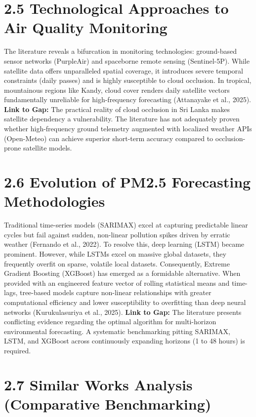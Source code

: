 \section{2.5 Technological Approaches to Air Quality
Monitoring}\label{technological-approaches-to-air-quality-monitoring}

The literature reveals a bifurcation in monitoring technologies:
ground-based sensor networks (PurpleAir) and spaceborne remote sensing
(Sentinel-5P). While satellite data offers unparalleled spatial
coverage, it introduces severe temporal constraints (daily passes) and
is highly susceptible to cloud occlusion. In tropical, mountainous
regions like Kandy, cloud cover renders daily satellite vectors
fundamentally unreliable for high-frequency forecasting (Attanayake et
al., 2025). \textbf{Link to Gap:} The practical reality of cloud
occlusion in Sri Lanka makes satellite dependency a vulnerability. The
literature has not adequately proven whether high-frequency ground
telemetry augmented with localized weather APIs (Open-Meteo) can achieve
superior short-term accuracy compared to occlusion-prone satellite
models.

\section{2.6 Evolution of PM2.5 Forecasting
Methodologies}\label{evolution-of-pm2.5-forecasting-methodologies}

Traditional time-series models (SARIMAX) excel at capturing predictable
linear cycles but fail against sudden, non-linear pollution spikes
driven by erratic weather (Fernando et al., 2022). To resolve this, deep
learning (LSTM) became prominent. However, while LSTMs excel on massive
global datasets, they frequently overfit on sparse, volatile local
datasets. Consequently, Extreme Gradient Boosting (XGBoost) has emerged
as a formidable alternative. When provided with an engineered feature
vector of rolling statistical means and time-lags, tree-based models
capture non-linear relationships with greater computational efficiency
and lower susceptibility to overfitting than deep neural networks
(Kurukulasuriya et al., 2025). \textbf{Link to Gap:} The literature
presents conflicting evidence regarding the optimal algorithm for
multi-horizon environmental forecasting. A systematic benchmarking
pitting SARIMAX, LSTM, and XGBoost across continuously expanding
horizons (1 to 48 hours) is required.

\section{2.7 Similar Works Analysis (Comparative
Benchmarking)}\label{similar-works-analysis-comparative-benchmarking}

